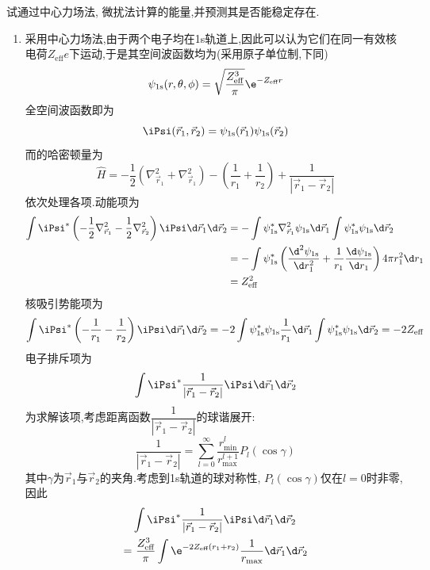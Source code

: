 \documentclass{ctexart}
\begin{document}
\begin{homework}[9.]
    试通过中心力场法, 微扰法计算的能量,并预测其是否能稳定存在.
\end{homework}
\begin{solution}
    \begin{enumerate}[label=\tbf{(\alph*)}]
        \item 采用中心力场法,由于两个电子均在1s轨道上,因此可以认为它们在同一有效核电荷$Z_{\text{eff}}e$下运动,于是其空间波函数均为(采用原子单位制,下同)
        \[\psi_{1\text{s}}(r,\theta,\phi)=\sqrt{\dfrac{Z_{\text{eff}}^3}{\pi}}\e^{-Z_{\text{eff}}r}\]
        全空间波函数即为
        \[\iPsi(\vec{r}_1,\vec{r}_2)=\psi_{\text{1s}}(\vec{r}_1)\psi_{\text{1s}}(\vec{r}_2)\]
        而的哈密顿量为
        \[\hat{H}=-\dfrac12\left(\nabla_{\vec{r}_1}^2+\nabla_{\vec{r}_1}^2\right)-\left(\dfrac{1}{r_1}+\dfrac{1}{r_2}\right)+\dfrac{1}{\left|\vec{r}_1-\vec{r}_2\right|}\]
        依次处理各项.动能项为
        \[\begin{aligned}
            \int\iPsi^\ast\left(-\dfrac12\nabla_{\vec{r}_1}^2-\dfrac12\nabla_{\vec{r}_2}^2\right)\iPsi\d\vec{r}_1\d\vec{r}_2
            &=-\int\psi^\ast_{\text{1s}}\nabla_{\vec{r}_1}^2\psi_{\text{1s}}\d\vec{r}_1\int\psi^\ast_{\text{1s}}\psi_{\text{1s}}\d\vec{r}_2\\
            &=-\int\psi^\ast_{\text{1s}}\left(\dfrac{\d^2\psi_{\text{1s}}}{\d r_1^2}+\dfrac{1}{r_1}\dfrac{\d\psi_{\text{1s}}}{\d r_1}\right)4\pi r_1^2\d r_1\\
            &=Z_{\text{eff}}^2
        \end{aligned}\]
        核吸引势能项为
        \[\int\iPsi^\ast\left(-\dfrac{1}{r_1}-\dfrac{1}{r_2}\right)\iPsi\d\vec{r}_1\d\vec{r}_2=-2\int\psi^\ast_{\text{1s}}\psi_{\text{1s}}\dfrac{1}{r_1}\d\vec{r}_1\int\psi^\ast_{\text{1s}}\psi_{\text{1s}}\d\vec{r}_2=-2Z_{\text{eff}}\]
        电子排斥项为
        \[\int\iPsi^\ast\dfrac{1}{\left|\vec{r}_1-\vec{r}_2\right|}\iPsi\d\vec{r}_1\d\vec{r}_2\]
        为求解该项,考虑距离函数$\dfrac{1}{\left|\vec{r}_1-\vec{r}_2\right|}$的球谐展开:
        \[\dfrac{1}{\left|\vec{r}_1-\vec{r}_2\right|}=\sum_{l=0}^{\infty}\dfrac{r_{\min}^l}{r_{\max}^{l+1}}P_l(\cos\gamma)\]
        其中$\gamma$为$\vec{r}_1$与$\vec{r}_2$的夹角.考虑到1s轨道的球对称性, $P_l(\cos\gamma)$仅在$l=0$时非零,因此
        \[\begin{aligned}
            &\int\iPsi^\ast\dfrac{1}{\left|\vec{r}_1-\vec{r}_2\right|}\iPsi\d\vec{r}_1\d\vec{r}_2\\
            =&\ \dfrac{Z_{\text{eff}}^3}{\pi}\int\e^{-2Z_{\text{eff}}(r_1+r_2)}\dfrac{1}{r_{\max}}\d\vec{r}_1\d\vec{r}_2\\

\end{aligned}\]
\end{enumerate}
\end{solution}
\end{document}
